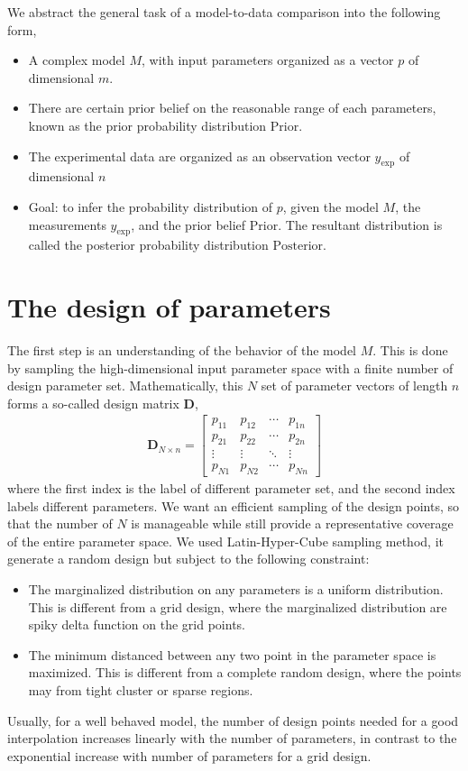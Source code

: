 We abstract the general task of a model-to-data comparison into the following form,
\begin{itemize}
\item A complex model $M$, with input parameters organized as a vector $p$ of dimensional $m$.
\item There are certain prior belief on the reasonable range of each parameters, known as the prior probability distribution $\mathrm{Prior}$.
\item The experimental data are organized as an observation vector $y_{\exp}$ of dimensional $n$
\item Goal: to infer the probability distribution of $p$, given the model $M$, the measurements $y_{\exp}$, and the prior belief $\mathrm{Prior}$. The resultant distribution is called the posterior probability distribution $\mathrm{Posterior}$.
\end{itemize}

\section{The design of parameters}
The first step is an understanding of the behavior of the model $M$.
This is done by sampling the high-dimensional input parameter space with a finite number of design parameter set.
Mathematically, this $N$ set of parameter vectors of length $n$ forms a so-called design matrix $\mathbf{D}$,
\begin{eqnarray}
\mathbf{D}_{N\times n} = 
\begin{bmatrix}
p_{11} & p_{12} & \cdots & p_{1n}\\
p_{21} & p_{22} & \cdots & p_{2n}\\
\vdots & \vdots & \ddots & \vdots \\
p_{N1} & p_{N2} & \cdots & p_{Nn}
\end{bmatrix}
\end{eqnarray}
where the first index is the label of different parameter set, and the second index labels different parameters.
We want an efficient sampling of the design points, so that the number of $N$ is manageable while still provide a representative coverage of the entire parameter space.
We used Latin-Hyper-Cube sampling method, it generate a random design but subject to the following constraint:
\begin{itemize}
\item The marginalized distribution on any parameters is a uniform distribution. This is different from a grid design, where the marginalized distribution are spiky delta function on the grid points.
\item The minimum distanced between any two point in the parameter space is maximized. This is different from a complete random design, where the points may from tight cluster or sparse regions.
\end{itemize}
Usually, for a well behaved model, the number of design points needed for a good interpolation increases linearly with the number of parameters, in contrast to the exponential increase with number of parameters for a grid design.

